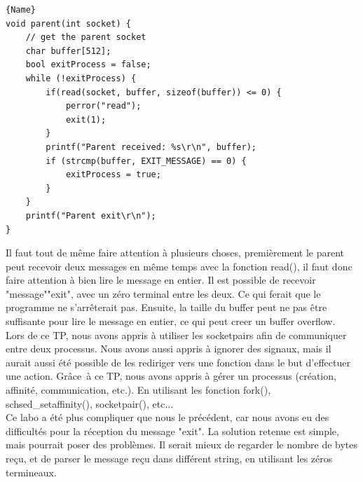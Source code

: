 \documentclass[
	a4paper, %
	10pt, %
]{CSUniSchoolLabReport}
\begin{document}
\begin{minipage}{.45\textwidth}
\begin{lstlisting}[style=CStyle, caption=Processus Parent, firstnumber=1]{Name}
void parent(int socket) {
	// get the parent socket
	char buffer[512];
	bool exitProcess = false;
	while (!exitProcess) {
		if(read(socket, buffer, sizeof(buffer)) <= 0) {
			perror("read");
			exit(1);
		}
		printf("Parent received: %s\r\n", buffer);
		if (strcmp(buffer, EXIT_MESSAGE) == 0) {
			exitProcess = true;
		}
	}
	printf("Parent exit\r\n");
}
\end{lstlisting}
\end{minipage}
Il faut tout de m\^eme faire attention \`a plusieurs choses, premi\`erement le parent peut recevoir deux messages en m\^eme temps avec la fonction read(), il faut donc faire attention à bien lire le message en entier.
Il est possible de recevoir "message""exit", avec un z\'ero terminal entre les deux. Ce qui ferait que le programme ne s'arr\^eterait pas.
Ensuite, la taille du buffer peut ne pas \^etre suffisante pour lire le message en entier, ce qui peut creer un buffer overflow.\\

Lors de ce TP, nous avons appris \`a utiliser les socketpairs afin de communiquer entre deux processus.
Nous avons aussi appris \`a ignorer des signaux, mais il aurait aussi été possible de les rediriger vers une fonction dans le but d'effectuer une action.
Gr\^ace\ \`a ce TP, nous avons appris \`a g\'erer un processus (création, affinité, communication, etc.). En utilisant les fonction fork(), schsed\_setaffinity(), socketpair(), etc...\\

Ce labo a été plus compliquer que nous le pr\'ec\'edent, car nous avons eu des difficultés pour la r\'eception du message "exit". La solution retenue est simple, mais pourrait poser des probl\`emes.
Il serait mieux de regarder le nombre de bytes re\c{c}u, et de parser le message re\c{c}u dans diff\'erent string, en utilisant les z\'eros termineaux.
\end{document}
